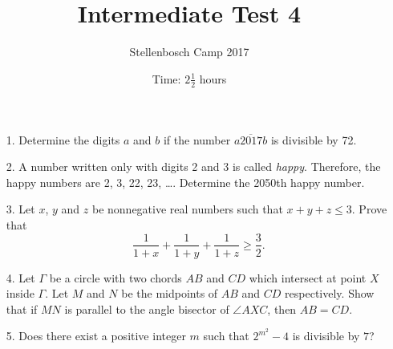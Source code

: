 \documentclass[12pt]{article}
\title{Intermediate Test 4}
\author{Stellenbosch Camp 2017}
\date{Time: $2\frac{1}{2}$ hours}
\begin{document}
 \maketitle

\begin{enumerate}

\item[1.] %
Determine the digits $a$ and $b$ if the number $\overline{a2017b}$ is divisible by 72.


\item[2.] %
A number written only with digits 2 and 3 is called \emph{happy}. Therefore, the happy numbers are 2, 3, 22, 23, \ldots. Determine the 2050th happy number.


\item[3.] %
Let $x$, $y$ and $z$ be nonnegative real numbers such that $x+y+z \leq 3$. Prove that
	\[ \frac{1}{1+x} +\frac{1}{1+y} +\frac{1}{1+z} \geq \frac{3}{2}. \]


\item[4.] %
Let $\Gamma$ be a circle with two chords $AB$ and $CD$ which intersect at point $X$ inside $\Gamma$. Let $M$ and $N$ be the midpoints of $AB$ and $CD$ respectively. Show that if $MN$ is parallel to the angle bisector of $\angle AXC$, then $AB = CD$.
 

\item[5.] %
Does there exist a positive integer $m$ such that $2^{m^2} - 4$ is divisible by $7$?


\end{enumerate}
\end{document}
